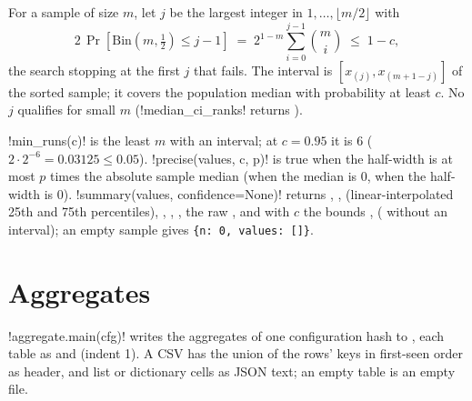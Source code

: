 \begin{definition}
For a sample of size $m$, let $j$ be the largest integer in $1,\dots,\lfloor m/2\rfloor$ with
\[
  2\,\Pr[\mathrm{Bin}(m, \tfrac12)\le j-1] \;=\; 2^{1-m}\sum_{i=0}^{j-1}\binom{m}{i} \;\le\; 1-c,
\]
the search stopping at the first $j$ that fails. The interval is $[x_{(j)}, x_{(m+1-j)}]$ of the
sorted sample; it covers the population median with probability at least $c$. No $j$ qualifies
for small $m$ (\py!median_ci_ranks! returns ).
\end{definition}

\py!min_runs(c)! is the least $m$ with an interval; at $c=0.95$ it is 6 ($2\cdot2^{-6} =
0.03125 \le 0.05$). \py!precise(values, c, p)! is true when the half-width is at most $p$ times
the absolute sample median (when the median is 0, when the half-width is 0). \py!summary(values, confidence=None)! returns , ,  (linear-interpolated 25th and 75th
percentiles), , , , the raw , and with $c$ the bounds
,  ( without an interval); an empty sample gives
\texttt{\{n: 0, values: []\}}.

\section{Aggregates}\label{sec:bench-aggregate}

\py!aggregate.main(cfg)! writes the aggregates of one configuration hash to
, each table as  and  (indent 1). A CSV
has the union of the rows' keys in first-seen order as header, and list or dictionary cells as
JSON text; an empty table is an empty file.

